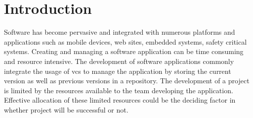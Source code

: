 \chapter{Introduction}
\label{chap:introduction}

Software has become pervasive and integrated with numerous platforms and applications such as mobile devices, web sites, embedded systems, safety critical systems. Creating and managing a software application can be time consuming and resource intensive. The development of software applications commonly integrate the usage of \gls{vcs} to manage the application by storing the current version as well as previous versions in a repository. The development of a project is limited by the resources available to the team developing the application. Effective allocation of these limited resources could be the deciding factor in whether project will be successful or not.






